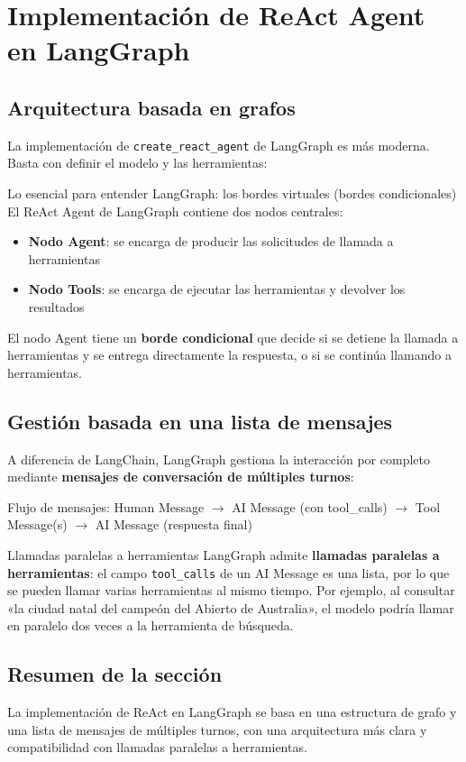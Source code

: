 \section{Implementación de ReAct Agent en LangGraph}

\subsection{Arquitectura basada en grafos}

La implementación de \texttt{create\_react\_agent} de LangGraph es más moderna. Basta con definir el modelo y las herramientas:

\begin{importantbox}{Lo esencial para entender LangGraph: los bordes virtuales (bordes condicionales)}
El ReAct Agent de LangGraph contiene dos nodos centrales:
\begin{itemize}
    \item \textbf{Nodo Agent}: se encarga de producir las solicitudes de llamada a herramientas
    \item \textbf{Nodo Tools}: se encarga de ejecutar las herramientas y devolver los resultados
\end{itemize}
El nodo Agent tiene un \textbf{borde condicional} que decide si se detiene la llamada a herramientas y se entrega directamente la respuesta, o si se continúa llamando a herramientas.
\end{importantbox}

\subsection{Gestión basada en una lista de mensajes}

A diferencia de LangChain, LangGraph gestiona la interacción por completo mediante \textbf{mensajes de conversación de múltiples turnos}:

Flujo de mensajes: Human Message $\rightarrow$ AI Message (con tool\_calls) $\rightarrow$ Tool Message(s) $\rightarrow$ AI Message (respuesta final)

\begin{knowledgebox}{Llamadas paralelas a herramientas}
LangGraph admite \textbf{llamadas paralelas a herramientas}: el campo \texttt{tool\_calls} de un AI Message es una lista, por lo que se pueden llamar varias herramientas al mismo tiempo. Por ejemplo, al consultar «la ciudad natal del campeón del Abierto de Australia», el modelo podría llamar en paralelo dos veces a la herramienta de búsqueda.
\end{knowledgebox}

\subsection{Resumen de la sección}
La implementación de ReAct en LangGraph se basa en una estructura de grafo y una lista de mensajes de múltiples turnos, con una arquitectura más clara y compatibilidad con llamadas paralelas a herramientas.

